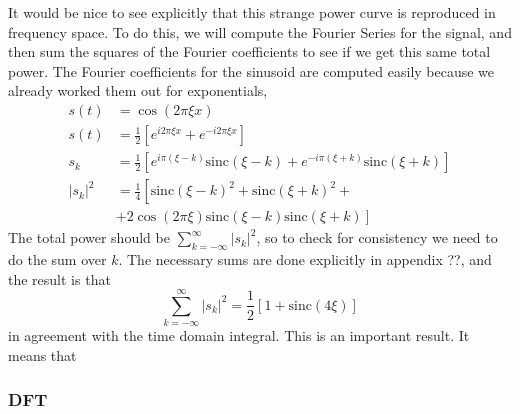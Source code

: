 \documentclass[twocolumn]{article}
\begin{document}
It would be nice to see explicitly that this strange power curve is
reproduced in frequency space. To do this, we will compute the Fourier
Series for the signal, and then sum the squares of the Fourier coefficients
to see if we get this same total power. The Fourier coefficients for
the sinusoid are computed easily because we already worked them out
for exponentials,\begin{align*}
s(t) & = \cos(2\pi\xi x)\\
s(t) & = \frac{1}{2}\left[e^{i2\pi\xi x}+e^{-i2\pi\xi x}\right]\\
s_{k} & = \frac{1}{2}\left[e^{i\pi(\xi-k)}\textrm{sinc}\left(\xi-k\right)+e^{-i\pi(\xi+k)}\textrm{sinc}\left(\xi+k\right)\right]\\
|s_{k}|^{2} & = \frac{1}{4}\left[\textrm{sinc}\left(\xi-k\right)^{2}+\textrm{sinc}\left(\xi+k\right)^{2}+\right.\\
 & + \left.2\cos\left(2\pi\xi\right)\textrm{sinc}\left(\xi-k\right)\textrm{sinc}\left(\xi+k\right)\right]
\end{align*}
The total power should be $\sum_{k=-\infty}^{\infty}|s_{k}|^{2}$,
so to check for consistency we need to do the sum over $k$. The necessary
sums are done explicitly in appendix ??, and the result is that\[
\sum_{k=-\infty}^{\infty}|s_{k}|^{2}=\frac{1}{2}\left[1+\textrm{sinc}\left(4\xi\right)\right]\]
in agreement with the time domain integral. This is an important result.
It means that 


\subsubsection{DFT}
\end{document}
